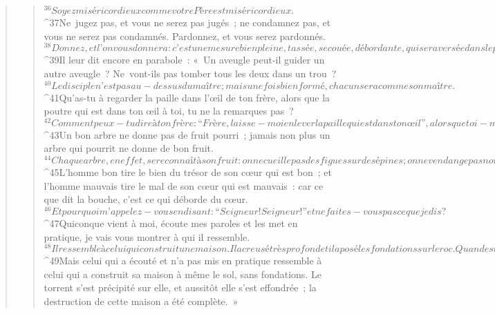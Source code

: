 \begin{verse}
\begin{verse}
${}^{36}Soyez miséricordieux comme votre Père est miséricordieux. 
${}^{37}Ne jugez pas, et vous ne serez pas jugés ; ne condamnez pas, et vous ne serez pas condamnés. Pardonnez, et vous serez pardonnés. 
${}^{38}Donnez, et l’on vous donnera : c’est une mesure bien pleine, tassée, secouée, débordante, qui sera versée dans le pan de votre vêtement ; car la mesure dont vous vous servez pour les autres servira de mesure aussi pour vous. »
${}^{39}Il leur dit encore en parabole :
      « Un aveugle peut-il guider un autre aveugle ? Ne vont-ils pas tomber tous les deux dans un trou ? 
${}^{40}Le disciple n’est pas au-dessus du maître ; mais une fois bien formé, chacun sera comme son maître.
${}^{41}Qu’as-tu à regarder la paille dans l’œil de ton frère, alors que la poutre qui est dans ton œil à toi, tu ne la remarques pas ? 
${}^{42}Comment peux-tu dire à ton frère : “Frère, laisse-moi enlever la paille qui est dans ton œil”, alors que toi-même ne vois pas la poutre qui est dans le tien ? Hypocrite ! Enlève d’abord la poutre de ton œil ; alors tu verras clair pour enlever la paille qui est dans l’œil de ton frère.
${}^{43}Un bon arbre ne donne pas de fruit pourri ; jamais non plus un arbre qui pourrit ne donne de bon fruit. 
${}^{44}Chaque arbre, en effet, se reconnaît à son fruit : on ne cueille pas des figues sur des épines ; on ne vendange pas non plus du raisin sur des ronces. 
${}^{45}L’homme bon tire le bien du trésor de son cœur qui est bon ; et l’homme mauvais tire le mal de son cœur qui est mauvais : car ce que dit la bouche, c’est ce qui déborde du cœur.
${}^{46}Et pourquoi m’appelez-vous en disant : “Seigneur ! Seigneur !” et ne faites-vous pas ce que je dis ? 
${}^{47}Quiconque vient à moi, écoute mes paroles et les met en pratique, je vais vous montrer à qui il ressemble. 
${}^{48}Il ressemble à celui qui construit une maison. Il a creusé très profond et il a posé les fondations sur le roc. Quand est venue l’inondation, le torrent s’est précipité sur cette maison, mais il n’a pas pu l’ébranler parce qu’elle était bien construite. 
${}^{49}Mais celui qui a écouté et n’a pas mis en pratique ressemble à celui qui a construit sa maison à même le sol, sans fondations. Le torrent s’est précipité sur elle, et aussitôt elle s’est effondrée ; la destruction de cette maison a été complète. »
      

\end{verse}
\end{verse}
